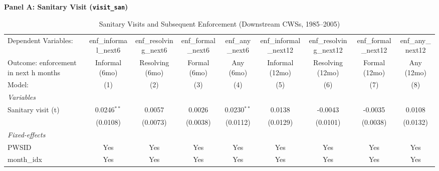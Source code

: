 \makeatletter
{}%
\makeatother
\begin{table}[htbp]
\centering
\caption{Sanitary Visits and Subsequent Enforcement (Downstream CWSs, 1985--2005)}
\label{tab:visit_to_enf}
\textbf{Panel A: Sanitary Visit (\texttt{visit\_san})}\\[4pt]
\begingroup
\centering
\begin{tabular}{lcccccccc}
   \tabularnewline \midrule \midrule
   Dependent Variables:                  & enf\_informal\_next6   & enf\_resolving\_next6   & enf\_formal\_next6    & enf\_any\_next6       & enf\_informal\_next12   & enf\_resolving\_next12   & enf\_formal\_next12   & enf\_any\_next12\\    
   Outcome: enforcement in next h months & Informal (6mo)         & Resolving (6mo)         & Formal (6mo)          & Any (6mo)             & Informal (12mo)         & Resolving (12mo)         & Formal (12mo)         & Any (12mo) \\   
   Model:                                & (1)                    & (2)                     & (3)                   & (4)                   & (5)                     & (6)                      & (7)                   & (8)\\  
   \midrule
   \emph{Variables}\\
   Sanitary visit (t)                    & 0.0246$^{**}$          & 0.0057                  & 0.0026                & 0.0230$^{**}$         & 0.0138                  & -0.0043                  & -0.0035               & 0.0108\\   
                                         & (0.0108)               & (0.0073)                & (0.0038)              & (0.0112)              & (0.0129)                & (0.0101)                 & (0.0038)              & (0.0132)\\   
   \midrule
   \emph{Fixed-effects}\\
   PWSID                                 & Yes                    & Yes                     & Yes                   & Yes                   & Yes                     & Yes                      & Yes                   & Yes\\  
   month\_idx                            & Yes                    & Yes                     & Yes                   & Yes                   & Yes                     & Yes                      & Yes                   & Yes\\  

\end{tabular}
\end{table}
